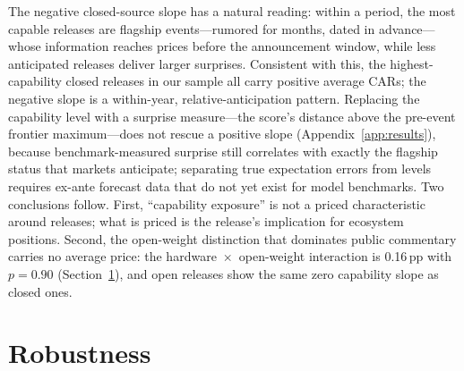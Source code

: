 \documentclass[review,12pt,authoryear]{elsarticle}
\newcommand{\pp}{\,pp}
\begin{document}
The negative closed-source slope has a natural reading: within a period, the
most capable releases are flagship events---rumored for months, dated in
advance---whose information reaches prices before the announcement window,
while less anticipated releases deliver larger surprises. Consistent with
this, the highest-capability closed releases in our sample all carry positive
average CARs; the negative slope is a within-year, relative-anticipation
pattern. Replacing the capability level with a surprise measure---the score's
distance above the pre-event frontier maximum---does not rescue a positive
slope (Appendix~\ref{app:results}), because benchmark-measured surprise still
correlates with exactly the flagship status that markets anticipate; separating
true expectation errors from levels requires ex-ante forecast data that do
not yet exist for model benchmarks. Two conclusions follow. First, ``capability exposure'' is not a
priced characteristic around releases; what is priced is the release's
implication for ecosystem positions. Second, the open-weight distinction that
dominates public commentary carries no average price: the
hardware~$\times$~open-weight interaction is 0.16\pp{} with $p=0.90$
(Section~\ref{sec:robust}), and open releases show the same zero capability
slope as closed ones.

\section{Robustness}\label{sec:robust}
\end{document}
